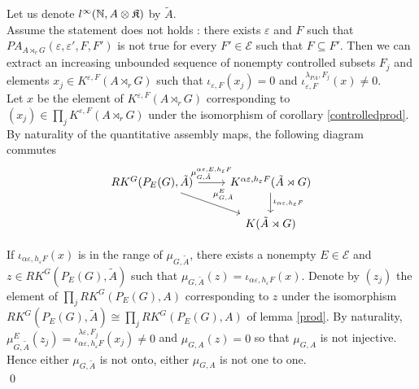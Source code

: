 \begin{dem}
Let us denote $l^\infty(\mathbb N,A\otimes\mathfrak K)$ by $\tilde A$.\\

Assume the statement does not holds : there exists $\varepsilon$ and $F$ such that $PA_{A\rtimes_r G}(\varepsilon,\varepsilon',F,F')$ is not true for every $F'\in\mathcal E$ such that $F \subseteq F'$. Then we can extract an increasing unbounded sequence of nonempty controlled subsets $F_j$ and elements $x_j\in K^{\varepsilon,F}(A\rtimes_r G)$ such that $\iota_{\varepsilon,F}(x_j)=0$ and $\iota_{\varepsilon,F}^{\lambda_{PA},F_j}(x)\neq 0$. \\

Let $x$ be the element of $K^{\varepsilon,F}(A\rtimes_r G)$ corresponding to $(x_j)\in\prod_j K^{\varepsilon,F}(A\rtimes_r G)$ under the isomorphism of corollary \ref{controlledprod}. By naturality of the quantitative assembly maps, the following diagram commutes
\[\begin{tikzcd}
RK^G(P_E(G),\tilde A) \arrow{r}{\mu_{G,\tilde A}^{\alpha\varepsilon,E, h_\varepsilon F}} \arrow{rd}{\mu_{G,\tilde A}^E} & K^{\alpha\varepsilon,h_\varepsilon F}(\tilde A\rtimes G) \arrow{d}{\iota_{\alpha\varepsilon, h_\varepsilon F}}\\
                                                      \                          & K(\tilde A\rtimes G)
\end{tikzcd}\]

If $\iota_{\alpha\varepsilon,h_\varepsilon F}(x)$ is in the range of $\mu_{G,\tilde A}$, there exists a nonempty $E\in\mathcal E$ and $z\in RK^G(P_E(G),\tilde A)$ such that $\mu_{G,\tilde A}(z)=\iota_{\alpha\varepsilon,h_\varepsilon F}(x)$. Denote by $(z_j)$ the element of $\prod_j RK^G(P_E(G),A)$ corresponding to $z$ under the isomorphism $RK^G(P_E(G),\tilde A) \cong \prod_j RK^G(P_E(G),A)$ of lemma \ref{prod}. By naturality, $\mu_{G,\tilde A}^E(z_j)=\iota_{\alpha\varepsilon,h_\varepsilon F}^{\lambda\varepsilon,F_j}(x_j)\neq 0$ and $\mu_{G,A}(z)=0$ so that $\mu_{G,A}$ is not injective. Hence either $\mu_{G,\tilde A}$ is not onto, either $\mu_{G,A}$ is not one to one. \\
\qed
\end{dem}

